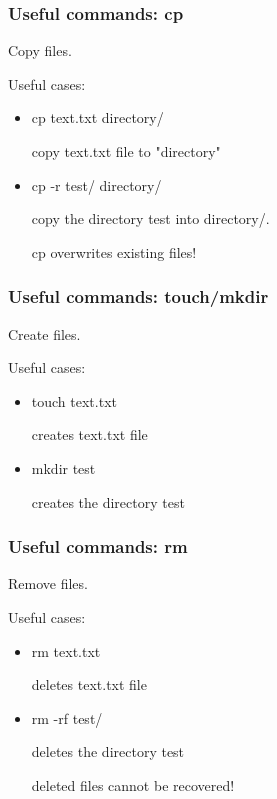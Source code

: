 \begin{frame}
	\frametitle{Useful commands: cp}
        Copy files.

Useful cases:
	\begin{itemize}
        \item cp text.txt directory/

        copy text.txt file to "directory" 
        \item cp -r test/ directory/ 
 
        copy the directory test into directory/. 

        cp overwrites existing files!

	\end{itemize}
        

\end{frame}


\begin{frame}
	\frametitle{Useful commands: touch/mkdir}
        Create files.

Useful cases:
	\begin{itemize}
        \item touch text.txt

        creates text.txt file  
        \item mkdir test  
 
        creates the directory test 

	\end{itemize}

\end{frame}

\begin{frame}
	\frametitle{Useful commands: rm}
        Remove files.

Useful cases:
	\begin{itemize}
        \item rm text.txt

        deletes text.txt file  
        \item rm -rf test/  
 
        deletes the directory test 

        deleted files cannot be recovered!

	\end{itemize}
        

\end{frame}

